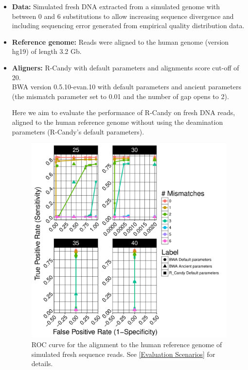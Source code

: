 \documentclass[11pt,a4paper]{report}
\begin{document}
 \begin{itemize}
 
   \item \textbf{Data:} Simulated fresh DNA extracted from a simulated genome 
   with between 0 and 6 substitutions to allow increasing sequence divergence
   and including sequencing error generated from empirical quality distribution
   data.
   
   \item \textbf{Reference genome:} Reads were aligned to the human genome 
   (version hg19) of length 3.2 Gb.

    \item \textbf{Aligners:} 
R-Candy with default parameters and alignments score cut-off of 20. \\
BWA version 0.5.10-evan.10 with default parameters and ancient
parameters (the mismatch parameter set to 0.01 and the number of gap
opens to 2)\cite{green2010draft}.


Here we aim to evaluate the performance of R-Candy on fresh DNA reads, 
aligned to the human reference genome without using the deamination parameters  
(R-Candy's default parameters).


\begin{figure}[H]
\centering
\includegraphics[width=12cm]{pictures/bROC_DS6_emp.pdf}
\caption{ 
ROC curve for the alignment to the human reference genome of simulated 
fresh sequence reads. See \ref{Evaluation Scenarios} for details.
}
\label{DS6_emp}
\end{figure}
  \end{itemize}
\end{document}
